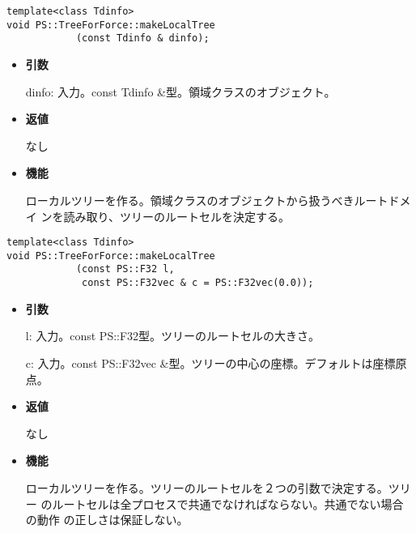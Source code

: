 
\begin{screen}
\begin{verbatim}
template<class Tdinfo>
void PS::TreeForForce::makeLocalTree
            (const Tdinfo & dinfo);
\end{verbatim}
\end{screen}

\begin{itemize}

\item {\bf 引数}

dinfo: 入力。const Tdinfo \&型。領域クラスのオブジェクト。

\item {\bf 返値}

なし

\item {\bf 機能}

ローカルツリーを作る。領域クラスのオブジェクトから扱うべきルートドメイ
ンを読み取り、ツリーのルートセルを決定する。

\end{itemize}

\begin{screen}
\begin{verbatim}
template<class Tdinfo>
void PS::TreeForForce::makeLocalTree
            (const PS::F32 l,
             const PS::F32vec & c = PS::F32vec(0.0));
\end{verbatim}
\end{screen}

\begin{itemize}

\item {\bf 引数}

l: 入力。const PS::F32型。ツリーのルートセルの大きさ。

c: 入力。const PS::F32vec \&型。ツリーの中心の座標。デフォルトは座標原点。

\item {\bf 返値}

なし

\item {\bf 機能}

ローカルツリーを作る。ツリーのルートセルを２つの引数で決定する。ツリー
のルートセルは全プロセスで共通でなければならない。共通でない場合の動作
の正しさは保証しない。

\end{itemize}

